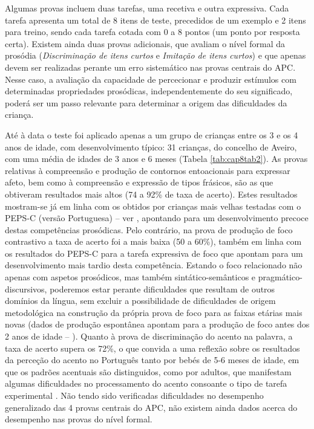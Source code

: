 \documentclass[output=paper,colorlinks,citecolor=brown,booklanguage=portuguese]{langscibook}
\begin{document}
Algumas provas incluem duas tarefas, uma recetiva e outra expressiva.  Cada tarefa apresenta um total de 8 itens de teste, precedidos de um exemplo e 2 itens para treino, sendo cada tarefa cotada com 0 a 8 pontos (um ponto por resposta certa). Existem ainda duas provas adicionais, que avaliam o nível formal da prosódia (\emph{Discriminação de itens curtos} e \emph{Imitação de itens curtos}) e que apenas devem ser realizadas perante um erro sistemático nas provas centrais do APC. Nesse caso, a avaliação da capacidade de percecionar e produzir estímulos com determinadas propriedades prosódicas, independentemente do seu significado, poderá ser um passo relevante para determinar a origem das dificuldades da criança. 

Até à data o teste foi aplicado apenas a um grupo de crianças entre os 3 e os 4 anos de idade, com desenvolvimento típico: 31 crianças, do concelho de Aveiro, com uma média de idades de 3 anos e 6 meses (Tabela \ref{tab:cap8tab2}). As provas relativas à compreensão e produção de contornos entoacionais para expressar afeto, bem como à compreensão e expressão de tipos frásicos, são as que obtiveram resultados mais altos (74 a 92\% de taxa de acerto). Estes resultados mostram-se já em linha com os obtidos por crianças mais velhas testadas com o PEPS-C (versão Portuguesa) -- ver , apontando para um desenvolvimento precoce destas competências prosódicas. Pelo contrário, na prova de produção de foco contrastivo a taxa de acerto foi a mais baixa (50 a 60\%), também em linha com os resultados do PEPS-C para a tarefa expressiva de foco que apontam para um desenvolvimento mais tardio desta competência. Estando o foco relacionado não apenas com aspetos prosódicos, mas também sintático-semânticos e pragmático-discursivos, poderemos estar perante dificuldades que resultam de outros domínios da língua, sem excluir a possibilidade de dificuldades de origem metodológica na construção da própria prova de foco para as faixas etárias mais novas (dados de produção espontânea apontam para a produção de foco antes dos 2 anos de idade -- \citealp{Frota2016b}). Quanto à prova de discriminação do acento na palavra, a taxa de acerto supera os 72\%, o que convida a uma reflexão sobre os resultados da perceção do acento no Português tanto por bebés de 5-6 meses de idade, em que os padrões acentuais são distinguidos, como por adultos, que manifestam algumas dificuldades no processamento do acento consoante o tipo de tarefa experimental \citep{Lu2018, Frota2020}. Não tendo sido verificadas dificuldades no desempenho generalizado das 4 provas centrais do APC, não existem ainda dados acerca do desempenho nas provas do nível formal.
\end{document}
